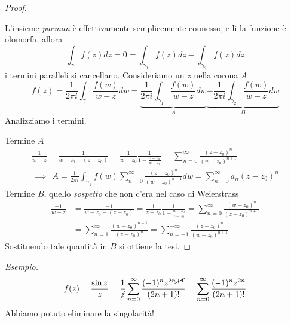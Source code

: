 \begin{proof}
\begin{figure}[htpb]

\end{figure}
\FloatBarrier

L'insieme \textit{pacman} è effettivamente semplicemente connesso, e lì la funzione è olomorfa, allora
\begin{equation*}
\int_{\gamma} f(z) dz = 0 = \int_{\gamma_{1}} f(z) dz - \int_{\gamma_{2}} f(z) dz
\end{equation*}
i termini paralleli si cancellano. Consideriamo un $z$ nella corona $A$
\begin{equation*}
f(z) = \frac{1}{2\pi i}\int_{\gamma}\frac{f(w)}{w - z} dw = \underbrace{\frac{1}{2\pi i}\int_{\gamma_{1}}\frac{f(w)}{w - z} dw}_{A}\underbrace{- \frac{1}{2\pi i}\int_{\gamma_{2}}\frac{f(w)}{w - z} dw}_{B}
\end{equation*}
Analizziamo i termini.

Termine $A$
\begin{gather*}
\frac{1}{w - z} = \frac{1}{w - z_{0} - (z - z_{0})} = \frac{1}{w - z_{0}}\frac{1}{1 - \frac{z - z_{0}}{w - z_{0}}} = \sum\limits^{\infty}_{n = 0}\frac{(z - z_{0})^{n}}{(w - z_{0})^{n + 1}}\\
\implies \ \ A = \frac{1}{2\pi i}\int_{\gamma_{1}} f(w)\sum\limits^{\infty}_{n = 0}\frac{(z - z_{0})^{n}}{(w - z_{0})^{n + 1}} dw = \sum\limits^{\infty}_{n = 0} a_{n}(z - z_{0})^{n}
\end{gather*}
Termine $B$, quello \textit{sospetto} che non c'era nel caso di Weierstrass
\begin{align*}
\frac{- 1}{w - z} & = \frac{- 1}{w - z_{0} - (z - z_{0})} = \frac{1}{z - z_{0}}\frac{1}{1 - \frac{w - z_{0}}{z - z_{0}}} = \sum\limits^{\infty}_{n = 0}\frac{(w - z_{0})^{n}}{(z - z_{0})^{n + 1}}\\
 & = \sum\limits^{\infty}_{n = 1}\frac{(w - z_{0})^{n - 1}}{(z - z_{0})^{n}} = \sum\limits^{- \infty}_{n = - 1}\frac{(z - z_{0})^{n}}{(w - z_{0})^{n + 1}}
\end{align*}
Sostituendo tale quantità in $B$ si ottiene la tesi.
\end{proof}
\textit{Esempio.}
\begin{equation*}
f(z) = \frac{\sin z}{z} = \frac{1}{\cancel{z}}\sum\limits^{\infty}_{n = 0}\frac{(- 1)^{n} z^{2n\cancel{+ 1}}}{(2n + 1) !} = \sum\limits^{\infty}_{n = 0}\frac{(- 1)^{n} z^{2n}}{(2n + 1) !}
\end{equation*}
Abbiamo potuto eliminare la singolarità!


